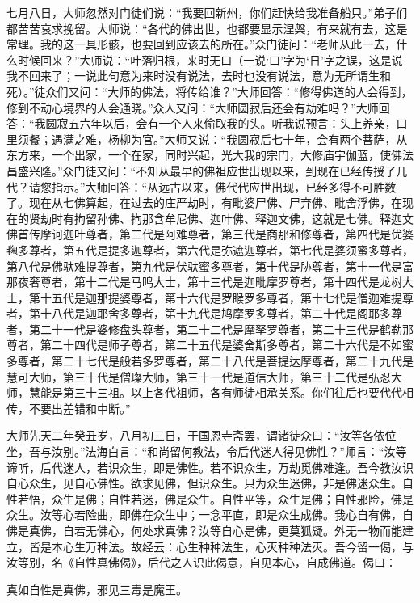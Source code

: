 \documentclass[12pt,twoside,openany]{book}
\newcommand{\kai}[1]{{\CJKfamily{kai}#1}}
\begin{document}
\kai{七月八日，大师忽然对门徒们说：“我要回新州，你们赶快给我准备船只。”弟子们都苦苦哀求挽留。大师说：“各代的佛出世，也都要显示涅槃，有来就有去，这是常理。我的这一具形骸，也要回到应该去的所在。”众门徒问：“老师从此一去，什么时候回来？”大师说：“叶落归根，来时无口（一说‘口’字为‘日’字之误，这是说我不回来了；一说此句意为来时没有说法，去时也没有说法，意为无所谓生和死）。”徒众们又问：“大师的佛法，将传给谁？”大师回答：“修得佛道的人会得到，修到不动心境界的人会通晓。”众人又问：“大师圆寂后还会有劫难吗？”大师回答：“我圆寂五六年以后，会有一个人来偷取我的头。听我说预言：头上养亲，口里须餐；遇满之难，杨柳为官。”大师又说：“我圆寂后七十年，会有两个菩萨，从东方来，一个出家，一个在家，同时兴起，光大我的宗门，大修庙宇伽蓝，使佛法昌盛兴隆。”众门徒又问：“不知从最早的佛祖应世出现以来，到现在已经传授了几代？请您指示。”大师回答：“从远古以来，佛代代应世出现，已经多得不可胜数了。现在从七佛算起，在过去的庄严劫时，有毗婆尸佛、尸弃佛、毗舍浮佛，在现在的贤劫时有拘留孙佛、拘那含牟尼佛、迦叶佛、释迦文佛，这就是七佛。释迦文佛首传摩诃迦叶尊者，第二代是阿难尊者，第三代是商那和修尊者，第四代是优婆毱多尊者，第五代是提多迦尊者，第六代是弥遮迦尊者，第七代是婆须蜜多尊者，第八代是佛驮难提尊者，第九代是伏驮蜜多尊者，第十代是胁尊者，第十一代是富那夜奢尊者，第十二代是马鸣大士，第十三代是迦毗摩罗尊者，第十四代是龙树大士，第十五代是迦那提婆尊者，第十六代是罗睺罗多尊者，第十七代是僧迦难提尊者，第十八代是迦耶舍多尊者，第十九代是鸠摩罗多尊者，第二十代是阁耶多尊者，第二十一代是婆修盘头尊者，第二十二代是摩孥罗尊者，第二十三代是鹤勒那尊者，第二十四代是师子尊者，第二十五代是婆舍斯多尊者，第二十六代是不如蜜多尊者，第二十七代是般若多罗尊者，第二十八代是菩提达摩尊者，第二十九代是慧可大师，第三十代是僧璨大师，第三十一代是道信大师，第三十二代是弘忍大师，慧能是第三十三祖。以上各代祖师，各有师徒相承关系。你们往后也要代代相传，不要出差错和中断。”}

大师先天二年癸丑岁，八月初三日，于国恩寺斋罢，谓诸徒众曰：“汝等各依位坐，吾与汝别。”法海白言：“和尚留何教法，令后代迷人得见佛性？”师言：“汝等谛听，后代迷人，若识众生，即是佛性。若不识众生，万劫觅佛难逢。吾今教汝识自心众生，见自心佛性。欲求见佛，但识众生。只为众生迷佛，非是佛迷众生。自性若悟，众生是佛；自性若迷，佛是众生。自性平等，众生是佛；自性邪险，佛是众生。汝等心若险曲，即佛在众生中；一念平直，即是众生成佛。我心自有佛，自佛是真佛，自若无佛心，何处求真佛？汝等自心是佛，更莫狐疑。外无一物而能建立，皆是本心生万种法。故经云：心生种种法生，心灭种种法灭。吾今留一偈，与汝等别，名《自性真佛偈》，后代之人识此偈意，自见本心，自成佛道。偈曰：

真如自性是真佛，邪见三毒是魔王。
\end{document}
